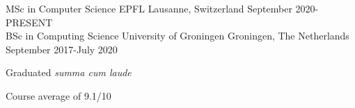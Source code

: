 
\begin{cventries}
  \cventry
    {MSc in Computer Science} %
    {EPFL} %
    {Lausanne, Switzerland} %
    {September 2020-PRESENT} %
    {}\\
    \cventry
    {BSc in Computing Science} %
    {University of Groningen} %
    {Groningen, The Netherlands} %
    {September 2017-July 2020} %
    {
    \begin{cvitems}
        \item {Graduated \textit{summa cum laude}}
        \item {Course average of 9.1/10}
      \end{cvitems}
    }
\end{cventries}
